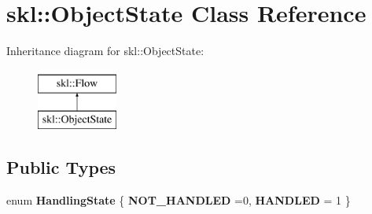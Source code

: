 \hypertarget{classskl_1_1_object_state}{}\section{skl\+:\+:Object\+State Class Reference}
\label{classskl_1_1_object_state}
Inheritance diagram for skl\+:\+:Object\+State\+:\begin{figure}[H]
\begin{center}
\leavevmode
\includegraphics[height=2.000000cm]{classskl_1_1_object_state}
\end{center}
\end{figure}
\subsection*{Public Types}
\begin{DoxyCompactItemize}
\item 
\hypertarget{classskl_1_1_object_state_ae78add76688604bf19f221cf84df44b6}{}\label{classskl_1_1_object_state_ae78add76688604bf19f221cf84df44b6} 
enum {\bfseries Handling\+State} \{ {\bfseries N\+O\+T\+\_\+\+H\+A\+N\+D\+L\+ED} =0, 
{\bfseries H\+A\+N\+D\+L\+ED} = 1
 \}
\end{DoxyCompactItemize}
